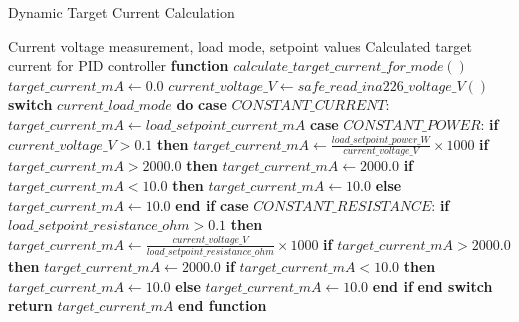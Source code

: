 \documentclass{article}
\begin{document}
\begin{algorithm}
\caption{Dynamic Target Current Calculation}
\label{alg:dynamic_target_calculation}
\begin{algorithmic}[1]
\REQUIRE Current voltage measurement, load mode, setpoint values
\ENSURE Calculated target current for PID controller
\STATE \textbf{function} $calculate\_target\_current\_for\_mode()$
\STATE $target\_current\_mA \leftarrow 0.0$
\STATE $current\_voltage\_V \leftarrow safe\_read\_ina226\_voltage\_V()$
\STATE
\STATE \textbf{switch} $current\_load\_mode$ \textbf{do}
    \STATE \textbf{case} $CONSTANT\_CURRENT$:
    \STATE \quad $target\_current\_mA \leftarrow load\_setpoint\_current\_mA$ 
    \STATE
    \STATE \textbf{case} $CONSTANT\_POWER$:
    \STATE \quad \textbf{if} $current\_voltage\_V > 0.1$ \textbf{then} 
    \STATE \quad \quad $target\_current\_mA \leftarrow \frac{load\_setpoint\_power\_W}{current\_voltage\_V} \times 1000$ 
    \STATE \quad \quad \textbf{if} $target\_current\_mA > 2000.0$ \textbf{then} $target\_current\_mA \leftarrow 2000.0$
    \STATE \quad \quad \textbf{if} $target\_current\_mA < 10.0$ \textbf{then} $target\_current\_mA \leftarrow 10.0$
    \STATE \quad \textbf{else}
    \STATE \quad \quad $target\_current\_mA \leftarrow 10.0$ 
    \STATE \quad \textbf{end if}
    \STATE
    \STATE \textbf{case} $CONSTANT\_RESISTANCE$:
    \STATE \quad \textbf{if} $load\_setpoint\_resistance\_ohm > 0.1$ \textbf{then} 
    \STATE \quad \quad $target\_current\_mA \leftarrow \frac{current\_voltage\_V}{load\_setpoint\_resistance\_ohm} \times 1000$ 
    \STATE \quad \quad \textbf{if} $target\_current\_mA > 2000.0$ \textbf{then} $target\_current\_mA \leftarrow 2000.0$
    \STATE \quad \quad \textbf{if} $target\_current\_mA < 10.0$ \textbf{then} $target\_current\_mA \leftarrow 10.0$
    \STATE \quad \textbf{else}
    \STATE \quad \quad $target\_current\_mA \leftarrow 10.0$ 
    \STATE \quad \textbf{end if}
\STATE \textbf{end switch}
\STATE
\STATE \textbf{return} $target\_current\_mA$
\STATE \textbf{end function}
\end{algorithmic}
\end{algorithm}
\end{document}
